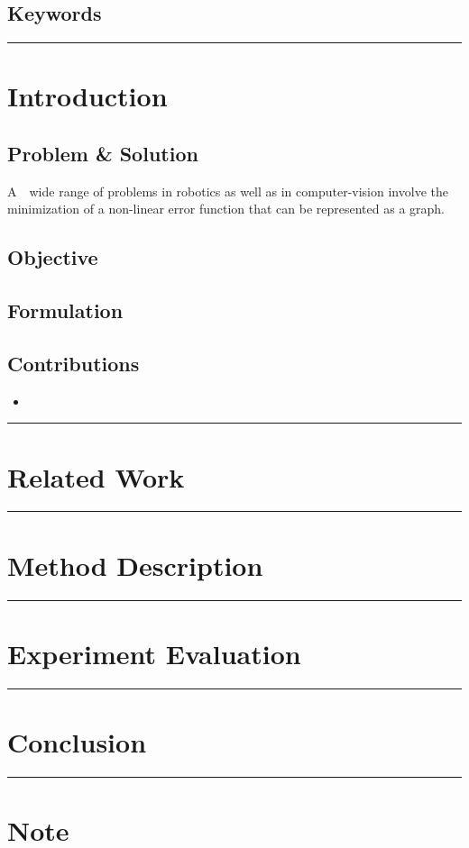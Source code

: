 \documentclass[letterpaper,10pt]{article}
\begin{document}
\subsection{Keywords}


\begin{center}\rule{\textwidth}{1pt}\end{center}
\section{Introduction}

\subsection{Problem \& Solution}
A　wide range of problems in robotics as well as in computer-vision involve the minimization of a non-linear error function that can be represented as a graph.

\subsection{Objective}


\subsection{Formulation}


\subsection{Contributions}
\begin{itemize}
	\item 
\end{itemize}

\begin{center}\rule{\textwidth}{1pt}\end{center}
\section{Related Work}


\begin{center}\rule{\textwidth}{1pt}\end{center}
\section{Method Description}


\begin{center}\rule{\textwidth}{1pt}\end{center}
\section{Experiment Evaluation}


\begin{center}\rule{\textwidth}{1pt}\end{center}
\section{Conclusion}


\begin{center}\rule{\textwidth}{1pt}\end{center}
\section{Note}
\end{document}
